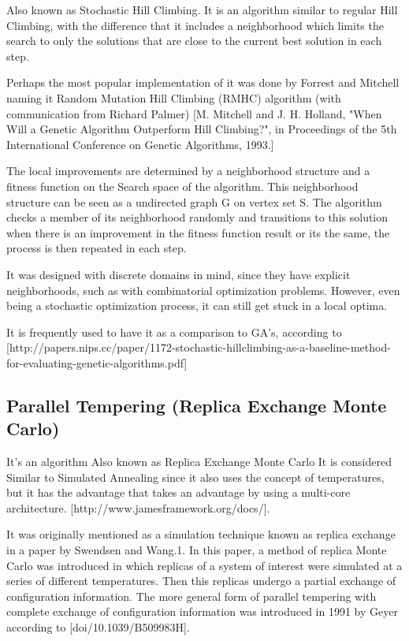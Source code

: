Also known as Stochastic Hill Climbing. It is an algorithm similar to regular Hill Climbing, with the difference that it includes a neighborhood which limits the search to only the solutions that are close to the current best solution in each step.

Perhaps the most popular implementation of it was done by Forrest and Mitchell naming it Random Mutation Hill Climbing (RMHC) algorithm (with communication from Richard Palmer) [M. Mitchell and J. H. Holland, "When Will a Genetic Algorithm Outperform Hill Climbing?", in Proceedings of the 5th International Conference on Genetic Algorithms, 1993.]

The local improvements are determined by a neighborhood structure and a fitness function on the Search space of the algorithm. This neighborhood structure can be seen as a undirected graph G on vertex set S. The algorithm checks a member of its neighborhood randomly and transitions to this solution when there is an improvement in the fitness function result or its the same, the process is then repeated in each step.

It was designed with discrete domains in mind, since they have explicit neighborhoods, such as with combinatorial optimization problems. However, even being a stochastic optimization process, it can still get stuck in a local optima.

It is frequently used to have it as a comparison to GA's, according to [http://papers.nips.cc/paper/1172-stochastic-hillclimbing-as-a-baseline-method-for-evaluating-genetic-algorithms.pdf]

\subsection{Parallel Tempering (Replica Exchange Monte Carlo)} 

It's an algorithm Also known as Replica Exchange Monte Carlo It is considered Similar to Simulated Annealing since it also uses the concept of temperatures, but it has the advantage that takes an advantage by using a multi-core architecture. [http://www.jamesframework.org/docs/].

It was originally mentioned as a simulation technique known as replica exchange in a paper by Swendsen and Wang.1. In this paper, a method of replica Monte Carlo was introduced in which replicas of a system of interest were simulated at a series of different temperatures. Then this replicas undergo a partial exchange of configuration information. The more general form of parallel tempering with complete exchange of configuration information was introduced in 1991 by Geyer according to [doi/10.1039/B509983H].

